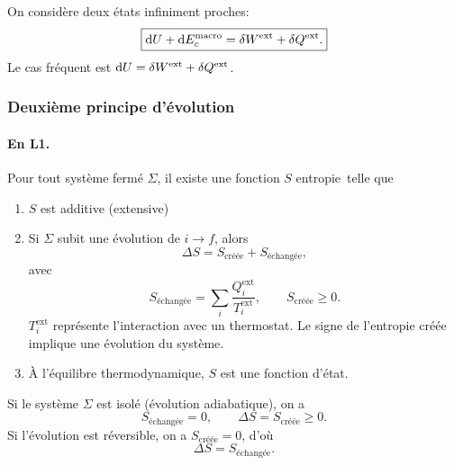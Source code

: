                 On considère deux états infiniment proches:
                \begin{equation}
                    \boxed{
                        \mathrm{d} U+\mathrm{d} E_c^{\text{macro}}=\delta W^{\text{ext}}+\delta Q^{\text{ext}}.
                    }
                \end{equation}
                Le cas fréquent est $\mathrm{d} U=\delta W^{\text{ext}}+\delta Q^{\text{ext}}$.

        \subsubsection{Deuxième principe \og d'évolution\fg}

            \paragraph{En L1.}
                Pour tout système fermé $\Sigma$, il existe une fonction $S$ \og entropie\fg~telle que
                \begin{enumerate}
                    \item $S$ est additive (extensive)
                    \item Si $\Sigma$ subit une évolution de $i\to f$, alors
                    \begin{equation}
                        \boxed{
                            \Delta S=S_{\text{créée}}+S_{\text{échangée}},
                        }
                    \end{equation}
                    avec
                    \begin{equation}
                        S_{\text{échangée}}=\sum_{i}\frac{Q_i^{\text{ext}}}{T_i^{\text{ext}}},\qquad S_{\text{créée}}\geqslant 0.
                    \end{equation}
                    $T_i^{\text{ext}}$ représente l'interaction avec un thermostat. Le signe de l'entropie créée implique une évolution du système.
                    \item À l'équilibre thermodynamique, $S$ est une fonction d'état.
                \end{enumerate}

                Si le système $\Sigma$ est isolé (évolution adiabatique), on a 
                \begin{equation}
                    \boxed{
                        S_{\text{échangée}}=0,\qquad\Delta S=S_{\text{créée}}\geqslant0.
                    }
                \end{equation}
                Si l'évolution est réversible, on a $S_{\text{créée}}=0$, d'où 
                \begin{equation}
                    \boxed{
                        \Delta S=S_{\text{échangée}}.
                    }
                \end{equation}

